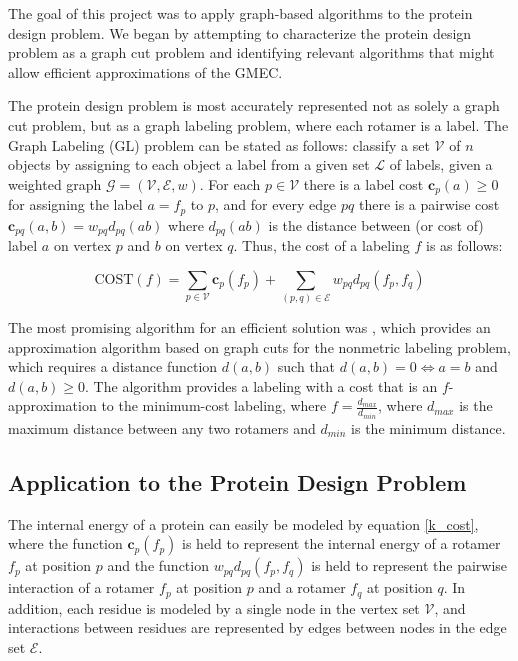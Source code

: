\documentclass[11pt]{article}
\begin{document}
	The goal of this project was to apply graph-based algorithms to the protein
	design problem. We began by attempting to characterize the protein design problem
	as a graph cut problem and identifying relevant algorithms that might allow
	efficient approximations of the GMEC. 
	
	The protein design problem is most accurately represented not as solely a
	graph cut problem, but as a graph labeling problem, where each rotamer is a label.
	The Graph Labeling (GL) problem can be stated as follows: classify a set 
	$\mathcal{V}$ of $n$ objects by assigning to each object a label from a given
	set $\mathcal{L}$ of labels, given a weighted graph
	$\mathcal{G}=(\mathcal{V},\mathcal{E},w)$. For each $p \in \mathcal{V}$ there
	is a label cost $\textbf{c}_{p}(a) \geq 0$ for assigning the label $a=f_p$ to
	$p$, and for every edge $pq$ there is a pairwise cost
	$\textbf{c}_{pq}(a,b) =  w_{pq}d_{pq}(ab)$ where $d_{pq}(ab)$ is the distance
	between (or cost of) label $a$ on vertex $p$ and $b$ on vertex $q$. Thus,
	the cost of a labeling $f$ is as follows:
		
	\begin{equation} \label{k_cost}
			\text{COST}(f) = 
			\sum\limits_{p \in \mathcal{V}} \textbf{c}_{p}(f_p) + 
			\sum\limits_{(p,q) \in \mathcal{E}} w_{pq}d_{pq}(f_p,f_q)
		\end{equation}

	The most promising algorithm for an efficient solution was \cite{Karmarkar}, 
	which provides an approximation algorithm based on graph cuts for the 
	nonmetric labeling problem, which requires a distance function $d(a,b)$ such
	that $d(a,b)=0 \iff a=b$ and $d(a,b) \geq 0$. The algorithm provides a labeling 
	with a cost that is an $f$-approximation to the minimum-cost labeling, where
	$f = \frac{d_{max}}{d_{min}}$, where $d_{max}$ is the maximum distance between
	any two rotamers and $d_{min}$ is the minimum distance. 

	\subsection{Application to the Protein Design Problem}
	
	The internal energy of a protein can easily be modeled by equation \ref{k_cost},
	where the function $\textbf{c}_{p}(f_p)$ is held to represent the internal
	energy of a rotamer $f_p$ at position $p$ and the function 
	$w_{pq}d_{pq}(f_p, f_q)$ is held to represent the pairwise interaction of a
	rotamer $f_p$ at position $p$ and a rotamer $f_q$ at position $q$. 	In addition,
	each residue is modeled by a single node in the vertex set $\mathcal{V}$, and
	interactions between residues are represented by edges between nodes in the edge
	set $\mathcal{E}$. 
	
\end{document}

